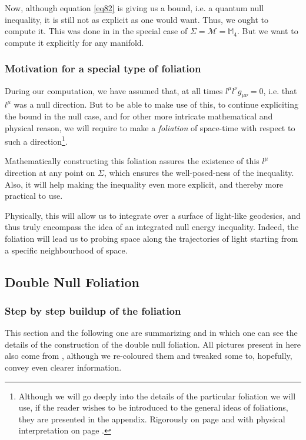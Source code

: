 \documentclass[a4paper,11pt]{article}
\numberwithin{equation}{section}
\theoremstyle{definition}
\begin{document}
Now, although equation \ref{eq82} is giving us a bound, i.e. a quantum null inequality, it is still not as explicit as one would want. Thus, we ought to compute it. This was done in \cite{DSNEC} in the special case of $\Sigma=\mathcal{M}=\mathbb{M}_4$. But we want to compute it explicitly for any manifold.
\subsubsection{Motivation for a special type of foliation}
During our computation, we have assumed that, at all times $l^\mu l^\nu g_{\mu\nu}=0$, i.e. that $l^\mu$ was a null direction. But to be able to make use of this, to continue expliciting the bound in the null case, and for other more intricate mathematical and physical reason, we will require to make a \emph{foliation} of space-time with respect to such a direction\footnote{Although we will go deeply into the details of the particular foliation we will use, if the reader wishes to be introduced to the general ideas of foliations, they are presented in the appendix. Rigorously on page \pageref{MatFoli} and with physical interpretation on page \pageref{PhyFoli}.}.

Mathematically constructing this foliation assures the existence of this $l^\mu$ direction at any point on $\Sigma$, which ensures the well-posed-ness of the inequality. Also, it will help making the inequality even more explicit, and thereby more practical to use.

Physically, this will allow us to integrate over a surface of light-like geodesics, and thus truly encompass the idea of an integrated null energy inequality. Indeed, the foliation will lead us to probing space along the trajectories of light starting from a specific neighbourhood of space.



\subsection{Double Null Foliation}
\subsubsection{Step by step buildup of the foliation}
This section and the following one are summarizing \cite{Chris} and \cite{Art} in which one can see the details of the construction of the double null foliation. All pictures present in here also come from \cite{Art}, although we re-coloured them and tweaked some to, hopefully, convey even clearer information.
\end{document}
